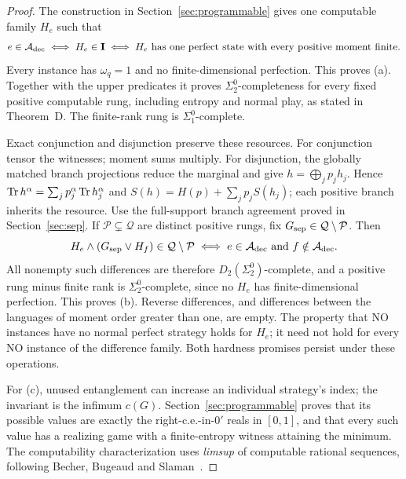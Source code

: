 \begin{proof}
The construction in Section~\ref{sec:programmable} gives one computable
family $H_e$ such that
\[
 e\in\mathcal A_{\rm dec}\iff H_e\in\mathbf I
 \iff H_e\text{ has one perfect state with every positive moment finite}.
\]
Every instance has $\omega_q=1$ and no finite-dimensional perfection.
This proves (a). Together with the upper predicates it proves
$\Sigma^0_2$-completeness for every fixed positive computable rung,
including entropy and normal play, as stated in Theorem~D. The
finite-rank rung is $\Sigma^0_1$-complete.

Exact conjunction and disjunction preserve these resources. For
conjunction tensor the witnesses; moment sums multiply. For disjunction,
the globally matched branch projections reduce the marginal and give
$h=\bigoplus_j p_jh_j$. Hence
$\operatorname{Tr} h^\alpha=\sum_jp_j^\alpha\operatorname{Tr} h_j^\alpha$ and
$S(h)=H(p)+\sum_jp_jS(h_j)$; each positive branch inherits the resource.
Use the full-support branch agreement proved in Section~\ref{sec:sep}.
If $\mathcal P\subsetneq\mathcal Q$ are distinct positive rungs, fix
$G_{\rm sep}\in\mathcal Q\setminus\mathcal P$. Then
\[
 H_e\wedge(G_{\rm sep}\vee H_f)\in\mathcal Q\setminus\mathcal P
 \iff e\in\mathcal A_{\rm dec}\text{ and }f\notin\mathcal A_{\rm dec}.
\]
All nonempty such differences are therefore $D_2(\Sigma^0_2)$-complete,
and a positive rung minus finite rank is $\Sigma^0_2$-complete, since
no $H_e$ has finite-dimensional perfection. This proves (b). Reverse
differences, and differences between the languages of moment order
greater than one, are empty. The property that NO instances have no
normal perfect strategy holds for $H_e$; it need not hold for every NO
instance of the difference family. Both hardness promises persist under
these operations.

For (c), unused entanglement can increase an individual strategy's
index; the invariant is the infimum $c(G)$. Section~\ref{sec:programmable}
proves that its possible values are exactly the right-c.e.-in-$0'$ reals
in $[0,1]$, and that every such value has a realizing game with a
finite-entropy witness attaining the minimum. The computability
characterization uses \emph{limsup} of computable rational sequences,
following Becher, Bugeaud and Slaman~\cite[Lemma~4]{BBS}.
\end{proof}
